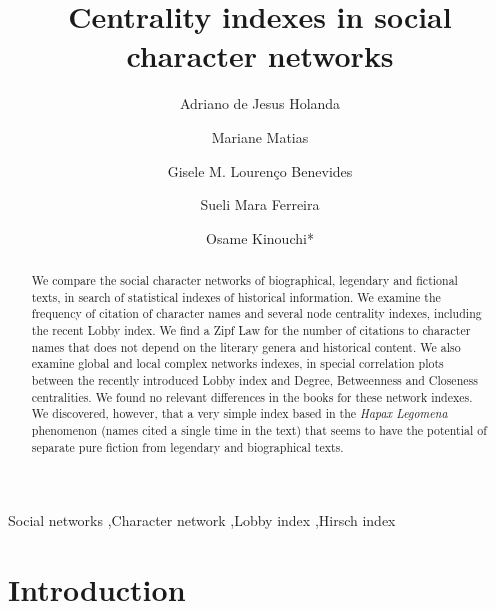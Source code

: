 \documentclass[review]{elsarticle}
\begin{document}
\begin{frontmatter}

\title{Centrality indexes in social character networks}

\author{Adriano de Jesus Holanda}
\author{Mariane Matias}
\author{Gisele M. Louren\c{c}o Benevides}
\author{Sueli Mara Ferreira}
\author{Osame Kinouchi*}
\address{Faculdade de Filosofia, Ci\^encias e Letras de Ribeir\~ao Preto,
Universidade de S\~ao Paulo, Av. Bandeirantes 3900, CEP 14040-901, 
Ribeir\~ao Preto, SP, Brazil}


\begin{abstract}
We compare the social character networks of biographical, 
legendary and fictional texts,
in search of statistical indexes of historical information. 
We examine the frequency of citation of character names and 
several node centrality indexes, including the recent Lobby
index. We find a Zipf Law for the number of citations to character 
names that does not depend on the literary genera and historical content.
We also examine global and local complex networks indexes,
in special correlation plots between the recently introduced Lobby index
and Degree, Betweenness and Closeness centralities. We found no
relevant differences in the books for these network indexes.
We discovered, however, that a very simple index based in 
the \emph{Hapax Legomena}
phenomenon (names cited a single time in the text) that seems to 
have the potential of separate pure fiction from 
legendary and biographical texts.

\end{abstract}

\begin{keyword}
Social networks \sep Character network 
\sep Lobby index \sep Hirsch index 



\end{keyword}

\end{frontmatter}

\linenumbers

\section{Introduction}
\end{document}
